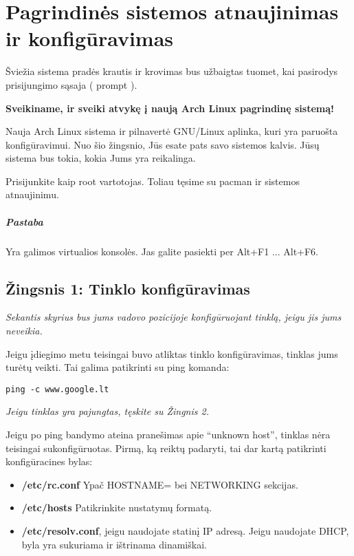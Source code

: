 \chapter{Pagrindinės sistemos atnaujinimas ir konfigūravimas}

  Šviežia sistema pradės krautis ir krovimas bus užbaigtas tuomet, kai
  pasirodys prisijungimo sąsaja ( prompt ).

  \textbf{Sveikiname, ir sveiki atvykę į naują Arch Linux pagrindinę
    sistemą!}

  Nauja Arch Linux sistema ir pilnavertė GNU/Linux aplinka, kuri yra
  paruošta konfigūravimui. Nuo šio žingsnio, Jūs esate pats savo
  sistemos kalvis. Jūsų sistema bus tokia, kokia Jums yra reikalinga.

  Prisijunkite kaip root vartotojas. Toliau tęsime su pacman ir
  sistemos atnaujinimu.

  \paragraph{Pastaba} Yra galimos virtualios konsolės. Jas galite
  pasiekti per Alt+F1 ... Alt+F6.

  \section{Žingsnis 1: Tinklo konfigūravimas}

    \textsl{Sekantis skyrius bus jums vadovo pozicijoje konfigūruojant
    tinklą, jeigu jis jums neveikia.}

    Jeigu įdiegimo metu teisingai buvo atliktas tinklo konfigūravimas,
    tinklas jums turėtų veikti. Tai galima patikrinti su ping komanda:

    \begin{verbatim}
ping -c www.google.lt
    \end{verbatim}

    \textsl{Jeigu tinklas yra pajungtas, tęskite su Žingnis 2.}

    Jeigu po ping bandymo ateina pranešimas apie ``unknown host'',
    tinklas nėra teisingai sukonfigūruotas. Pirmą, ką reiktų padaryti,
    tai dar kartą patikrinti konfigūracines bylas:

    \begin{itemize}
      \item \textbf{/etc/rc.conf} Ypač HOSTNAME= bei NETWORKING
        sekcijas.
      \item \textbf{/etc/hosts} Patikrinkite nustatymų formatą.
      \item \textbf{/etc/resolv.conf}, jeigu naudojate statinį IP
        adresą. Jeigu naudojate DHCP, byla yra sukuriama ir ištrinama
        dinamiškai. 
    \end{itemize}

